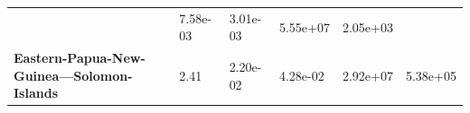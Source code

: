 \begin{table}[H]
{\begin{tabular}{llllll}
                                                                & 7.58e-03
                                                                & 3.01e-03
                                                                & 5.55e+07
                                                                & 2.05e+03
            \\
            \textbf{Eastern-Papua-New-Guinea---Solomon-Islands} & 2.41
                                                                & 2.20e-02
                                                                &
            4.28e-02                                            & 2.92e+07
                                                                & 5.38e+05
            \\
            \hline
        \end{tabular}%
    }
\end{table}